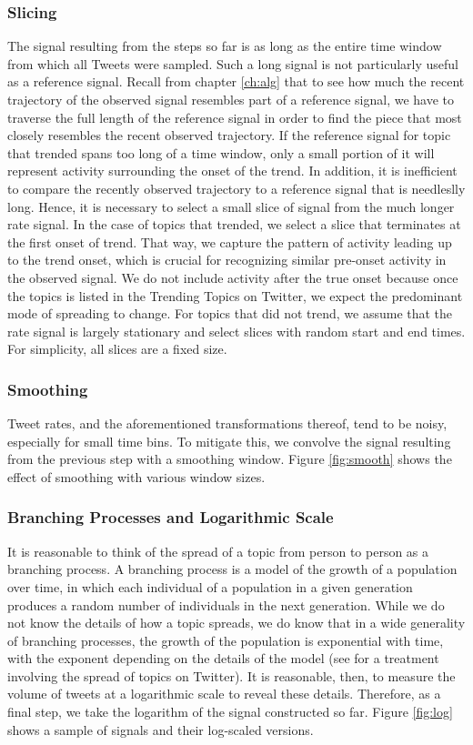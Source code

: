 \subsubsection{Slicing}
The signal resulting from the steps so far is as long as the entire time window
from which all Tweets were sampled. Such a long signal is not particularly
useful as a reference signal. Recall from chapter \ref{ch:alg} that to see how
much the recent trajectory of the observed signal resembles part of a reference
signal, we have to traverse the full length of the reference signal in order to
find the piece that most closely resembles the recent observed trajectory. If
the reference signal for topic that trended spans too long of a time window,
only a small portion of it will represent activity surrounding the onset of the
trend. In addition, it is inefficient to compare the recently observed
trajectory to a reference signal that is needleslly long. Hence, it is necessary
to select a small slice of signal from the much longer rate signal. In the case
of topics that trended, we select a slice that terminates at the first onset of
trend. That way, we capture the pattern of activity leading up to the trend
onset, which is crucial for recognizing similar pre-onset activity in the
observed signal. We do not include activity after the true onset because once
the topics is listed in the Trending Topics on Twitter, we expect the
predominant mode of spreading to change. For topics that did not trend, we
assume that the rate signal is largely stationary and select slices with random
start and end times. For simplicity, all slices are a fixed size.

\subsubsection{Smoothing}
Tweet rates, and the aforementioned transformations thereof, tend to be noisy,
especially for small time bins. To mitigate this, we convolve the signal
resulting from the previous step with a smoothing window. Figure
\ref{fig:smooth} shows the effect of smoothing with various window sizes.

\subsubsection{Branching Processes and Logarithmic Scale}
It is reasonable to think of the spread of a topic from person to person as a
branching process. A branching process is a model of the growth of a population
over time, in which each individual of a population in a given generation
produces a random number of individuals in the next generation. While we do not
know the details of how a topic spreads, we do know that in a wide generality of
branching processes, the growth of the population is exponential with time, with
the exponent depending on the details of the model \cite{AthreyaNey} (see
\cite{Szabo} for a treatment involving the spread of topics on Twitter). It is
reasonable, then, to measure the volume of tweets at a logarithmic scale to
reveal these details. Therefore, as a final step, we take the logarithm of the
signal constructed so far. Figure \ref{fig:log} shows a sample of signals and
their log-scaled versions.

